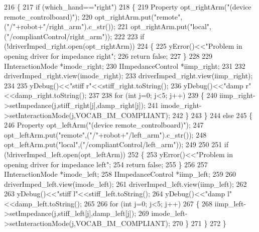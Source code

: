 \begin{DoxyCode}
216 \{
217     \textcolor{keywordflow}{if} (which\_hand==\textcolor{stringliteral}{"right"})
218     \{
219         Property opt\_rightArm(\textcolor{stringliteral}{"(device remote\_controlboard)"});
220         opt\_rightArm.put(\textcolor{stringliteral}{"remote"},(\textcolor{stringliteral}{"/"}+robot+\textcolor{stringliteral}{"/right\_arm"}).c\_str());
221         opt\_rightArm.put(\textcolor{stringliteral}{"local"},(\textcolor{stringliteral}{"/compliantControl/right\_arm"}));
222 
223         \textcolor{keywordflow}{if} (!driverImped\_right.open(opt\_rightArm))
224         \{
225             yError()<<\textcolor{stringliteral}{"Problem in opening driver for impedance right"};
226             \textcolor{keywordflow}{return} \textcolor{keyword}{false};
227         \}
228 
229         IInteractionMode  *imode\_right;
230         IImpedanceControl *iimp\_right;
231 
232         driverImped\_right.view(imode\_right);
233         driverImped\_right.view(iimp\_right);
234 
235         yDebug()<<\textcolor{stringliteral}{"stiff r"}<<stiff_right.toString();
236         yDebug()<<\textcolor{stringliteral}{"damp r"}<<damp_right.toString();
237 
238         \textcolor{keywordflow}{for} (\textcolor{keywordtype}{int} j=0; j<5; j++)
239         \{
240             iimp\_right->setImpedance(j,stiff_right[j],damp_right[j]);
241             imode\_right->setInteractionMode(j,VOCAB\_IM\_COMPLIANT);
242         \}
243     \}
244     \textcolor{keywordflow}{else}
245     \{
246         Property opt\_leftArm(\textcolor{stringliteral}{"(device remote\_controlboard)"});
247         opt\_leftArm.put(\textcolor{stringliteral}{"remote"},(\textcolor{stringliteral}{"/"}+robot+\textcolor{stringliteral}{"/left\_arm"}).c\_str());
248         opt\_leftArm.put(\textcolor{stringliteral}{"local"},(\textcolor{stringliteral}{"/compliantControl/left\_arm"}));
249     
250         
251         \textcolor{keywordflow}{if} (!driverImped\_left.open(opt\_leftArm))
252         \{
253             yError()<<\textcolor{stringliteral}{"Problem in opening driver for impedance left"};
254             \textcolor{keywordflow}{return} \textcolor{keyword}{false};
255         \}
256 
257         IInteractionMode  *imode\_left;
258         IImpedanceControl *iimp\_left;
259 
260         driverImped\_left.view(imode\_left);
261         driverImped\_left.view(iimp\_left);
262 
263         yDebug()<<\textcolor{stringliteral}{"stiff l"}<<stiff_left.toString();
264         yDebug()<<\textcolor{stringliteral}{"damp l"}<<damp_left.toString();
265 
266         \textcolor{keywordflow}{for} (\textcolor{keywordtype}{int} j=0; j<5; j++)
267         \{
268             iimp\_left->setImpedance(j,stiff_left[j],damp_left[j]);
269             imode\_left->setInteractionMode(j,VOCAB\_IM\_COMPLIANT);
270         \}
271     \}
272 \}
\end{DoxyCode}
